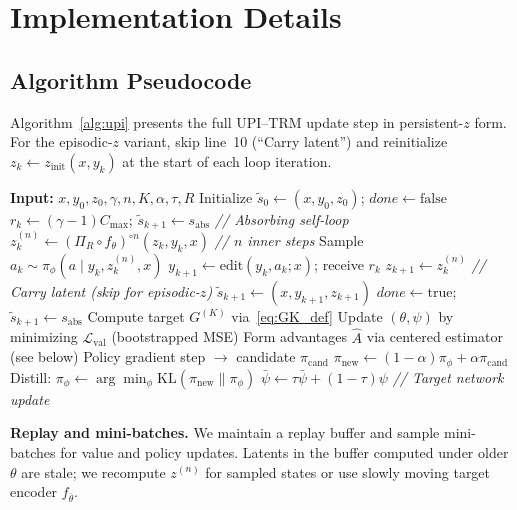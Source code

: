 \documentclass{article}
\theoremstyle{plain}
\theoremstyle{definition}
\theoremstyle{remark}
\newcommand{\shortonly}[1]{#1}
\newcommand{\shortonly}[1]{}
\newcommand{\KL}{\mathrm{KL}}
\begin{document}
\section{Implementation Details}
\label{app:implementation}

\shortonly{
\subsection{Algorithm Pseudocode}
\label{app:algorithm_pseudocode}

Algorithm~\ref{alg:upi} presents the full UPI--TRM update step in persistent-$z$ form.
For the episodic-$z$ variant, skip line~10 (``Carry latent'') and reinitialize $z_k \gets z_{\mathrm{init}}(x,y_k)$ at the start of each loop iteration.

\begin{algorithm}[h]
\small
\caption{UPI--TRM: single interaction + update step}
\label{alg:upi}
\begin{algorithmic}[1]
\STATE \textbf{Input:} $x, y_0, z_0, \gamma, n, K, \alpha, \tau, R$
\STATE Initialize $\tilde{s}_0 \gets (x,y_0,z_0)$; $\mathit{done} \gets \mathrm{false}$
\FOR{$k = 0$ to $K-1$}
  \IF{$\mathit{done}$}
    \STATE $r_k \gets (\gamma-1)C_{\max}$; $\tilde{s}_{k+1} \gets s_{\mathrm{abs}}$ \hfill \emph{// Absorbing self-loop}
  \ELSE
    \STATE $z_k^{(n)} \gets (\Pi_R \circ f_\theta)^{\circ n}(z_k,y_k,x)$ \hfill \emph{// $n$ inner steps}
    \STATE Sample $a_k \sim \pi_{\phi}(a \mid y_k,z_k^{(n)},x)$
    \STATE $y_{k+1} \gets \mathrm{edit}(y_k,a_k;x)$; receive $r_k$
    \STATE $z_{k+1} \gets z_k^{(n)}$ \hfill \emph{// Carry latent (skip for episodic-$z$)}
    \STATE $\tilde{s}_{k+1} \gets (x,y_{k+1},z_{k+1})$
    \IF{terminated}
     \STATE $\mathit{done} \gets \mathrm{true}$; $\tilde{s}_{k+1} \gets s_{\mathrm{abs}}$
    \ENDIF
  \ENDIF
\ENDFOR
\STATE Compute target $G^{(K)}$ via~\eqref{eq:GK_def}
\STATE Update $(\theta,\psi)$ by minimizing $\mathcal{L}_{\mathrm{val}}$ (bootstrapped MSE)
\STATE Form advantages $\widehat A$ via centered estimator (see below)
\STATE Policy gradient step $\to$ candidate $\pi_{\mathrm{cand}}$
\STATE $\pi_{\mathrm{new}} \gets (1-\alpha)\pi_{\phi} + \alpha\pi_{\mathrm{cand}}$
\STATE Distill: $\pi_\phi \gets \arg\min_\phi \KL(\pi_{\mathrm{new}} \| \pi_\phi)$
\STATE $\bar\psi \gets \tau \bar\psi + (1-\tau)\psi$ \hfill \emph{// Target network update}
\end{algorithmic}
\end{algorithm}
}

\textbf{Replay and mini-batches.}
We maintain a replay buffer and sample mini-batches for value and policy updates.
Latents in the buffer computed under older $\theta$ are stale; we recompute $z^{(n)}$ for sampled states or use slowly moving target encoder $f_{\bar\theta}$.
\end{document}
